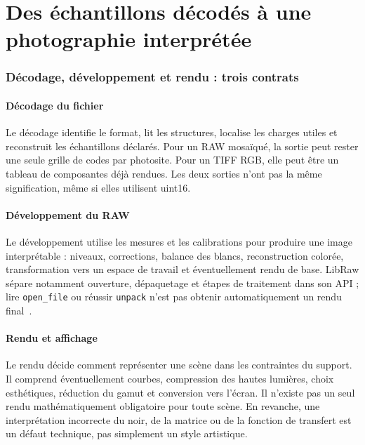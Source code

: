 \part{Des échantillons décodés à une photographie interprétée}
\section{Décodage, développement et rendu : trois contrats}
\subsection{Décodage du fichier}
Le décodage identifie le format, lit les structures, localise
les charges utiles et reconstruit les échantillons déclarés.
Pour un RAW mosaïqué, la sortie peut rester une seule grille
de codes par photosite. Pour un TIFF RGB, elle peut être un
tableau de composantes déjà rendues. Les deux sorties n'ont
pas la même signification, même si elles utilisent uint16.

\subsection{Développement du RAW}
Le développement utilise les mesures et les calibrations pour
produire une image interprétable : niveaux, corrections,
balance des blancs, reconstruction colorée, transformation
vers un espace de travail et éventuellement rendu de base.
LibRaw sépare notamment ouverture, dépaquetage et étapes de
traitement dans son API ; lire \texttt{open\_file} ou réussir
\texttt{unpack} n'est pas obtenir automatiquement un rendu
final~\cite{libraw}.

\subsection{Rendu et affichage}
Le rendu décide comment représenter une scène dans les
contraintes du support. Il comprend éventuellement courbes,
compression des hautes lumières, choix esthétiques, réduction
du gamut et conversion vers l'écran. Il n'existe pas un
seul rendu mathématiquement obligatoire pour toute scène.
En revanche, une interprétation incorrecte du noir, de la
matrice ou de la fonction de transfert est un défaut
technique, pas simplement un style artistique.


